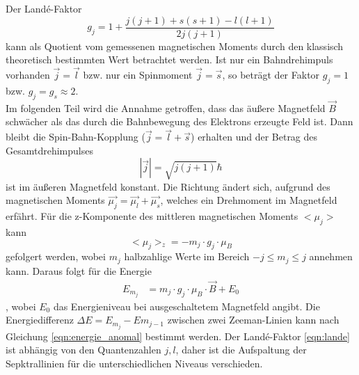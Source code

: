 Der Landé-Faktor
\begin{equation}
    g_j = 1 + \frac{j(j+1) + s(s+1) - l(l+1)}{2j(j+1)}
    \label{eqn:lande}
\end{equation}
kann als Quotient vom gemessenen magnetischen Moments durch den klassisch theoretisch bestimmten Wert betrachtet werden.
Ist nur ein Bahndrehimpuls vorhanden $\vec{j}=\vec{l}$ bzw. nur ein Spinmoment $\vec{j}=\vec{s}$, so beträgt der Faktor $g_j=1$ bzw. $g_j = g_s \approx 2$.
\\
Im folgenden Teil wird die Annahme getroffen, dass das äußere Magnetfeld $\vec{B}$ schwächer als das durch die Bahnbewegung des Elektrons erzeugte Feld ist.
Dann bleibt die Spin-Bahn-Kopplung ($\vec{j}=\vec{l}+\vec{s}$) erhalten und der Betrag des Gesamtdrehimpulses
\begin{equation}
    |\vec{j}| = \sqrt{j(j+1)} \hbar
\end{equation}
ist im äußeren Magnetfeld konstant.
Die Richtung ändert sich, aufgrund des magnetischen Moments $\vec{\mu_j} = \vec{\mu_l} + \vec{\mu_s}$, welches ein Drehmoment im Magnetfeld erfährt.
Für die z-Komponente des mittleren magnetischen Moments $<\mu_j>$ kann
\begin{equation}
    <\mu_j>_z = - m_j \cdot g_j \cdot \mu_B
\end{equation}
gefolgert werden, wobei $m_j$ halbzahlige Werte im Bereich $-j \leq m_j \leq j$ annehmen kann.
Daraus folgt für die Energie
\begin{align}
    E_{m_j} &= m_j \cdot g_j \cdot \mu_B \cdot \vec{B} + E_0
    \label{eqn:energie_anomal}
\end{align}
, wobei $E_0$ das Energieniveau bei ausgeschaltetem Magnetfeld angibt.
Die Energiedifferenz $\Delta E = E_{m_j} - E{m_{j-1}}$ zwischen zwei Zeeman-Linien kann nach Gleichung \eqref{eqn:energie_anomal} bestimmt werden.
Der Landé-Faktor \eqref{eqn:lande} ist abhängig von den Quantenzahlen $j,l$, daher ist die Aufspaltung der Sepktrallinien für die unterschiedlichen Niveaus verschieden.